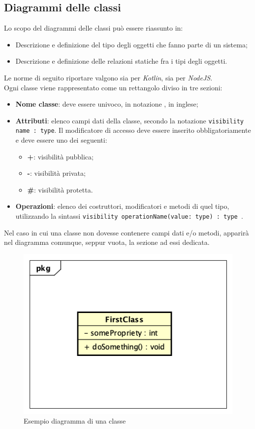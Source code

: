 \subsection{Diagrammi delle classi}
\label{DiagrammiDelleClassi}
Lo scopo del diagrammi delle classi può essere riassunto in:
\begin{itemize}
	\item Descrizione e definizione del tipo degli oggetti che fanno parte di un sistema;
	\item Descrizione e definizione delle relazioni statiche fra i tipi degli oggetti.
\end{itemize}
Le norme di seguito riportare valgono sia per \textit{Kotlin}, sia per \textit{NodeJS}.
\\
Ogni classe viene rappresentato come un rettangolo diviso in tre sezioni:
\begin{itemize}
	\item \textbf{Nome classe}: deve essere univoco, in notazione , in inglese;
	\item \textbf{Attributi}: elenco campi dati della classe, secondo la notazione \texttt{visibility name : type}. Il modificatore di accesso deve essere inserito obbligatoriamente e deve essere uno dei seguenti:
	\begin{itemize}
		\item \textbf{+}: visibilità pubblica;
		\item \textbf{-}: visibilità privata;
		\item \textbf{\#}: visibilità protetta.
	\end{itemize}
	\item \textbf{Operazioni}: elenco dei costruttori, modificatori e metodi di quel tipo, utilizzando la sintassi \texttt{visibility operationName(value: type) : type }.
\end{itemize}
Nel caso in cui una classe non dovesse contenere campi dati e/o metodi, apparirà nel diagramma comunque, seppur vuota, la sezione ad essi dedicata. 
\begin{figure}[h]
	\centering
	\includegraphics[scale=0.5]{images/SchemaClasse.png}
	\caption{Esempio diagramma di una classe}\label{}
\end{figure}
